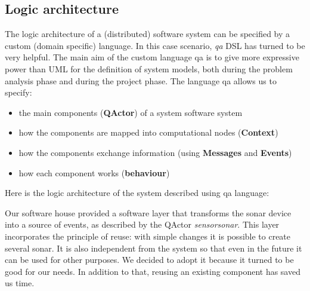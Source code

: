 \subsection{Logic architecture}
The logic architecture of a (distributed) software system can be specified by a custom (domain specific) language. In this case scenario, \textit{qa} DSL has turned to be very helpful. The main aim of the custom language qa is to give more expressive power than UML for the definition of system models, both during the problem analysis phase and during the project phase. The language qa allows us to specify:
\begin{itemize}
	\item the main components (\textbf{QActor}) of a system software system
	\item how the components are mapped into computational nodes (\textbf{Context})
	\item how the components exchange information (using \textbf{Messages} and \textbf{Events})
	\item how each component works (\textbf{behaviour})
\end{itemize}
Here is the logic architecture of the system described using qa language:

Our software house provided a software layer that transforms the sonar device into a source of events, as described by the QActor \textit{sensorsonar}. This layer incorporates the principle of reuse: with simple changes it is possible to create several sonar. It is also independent from the system so that even in the future it can be used for other purposes. We decided to adopt it because it turned to be good for our needs. In addition to that, reusing an existing component has saved us time.